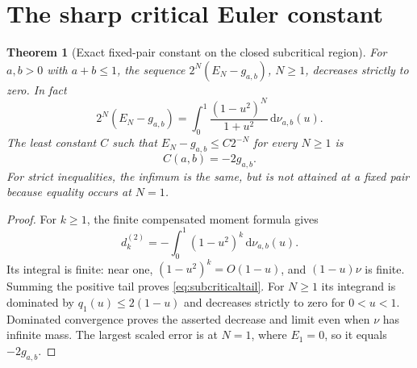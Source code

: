 \documentclass[11pt]{article}
\numberwithin{equation}{section}
\newtheorem{theorem}{Theorem}[section]
\theoremstyle{definition}
\theoremstyle{remark}
\newcommand{\dd}{\,\mathrm d}
\begin{document}
\section{The sharp critical Euler constant}
\label{sec:sharpconstant}
\begin{theorem}[Exact fixed-pair constant on the closed subcritical region]
\label{thm:pairconstant}
For $a,b>0$ with $a+b\le1$, the sequence
$2^N(E_N-g_{a,b})$, $N\ge1$, decreases strictly to zero. In fact
\begin{equation}\label{eq:subcriticaltail}
 2^N(E_N-g_{a,b})
 =\int_0^1\frac{(1-u^2)^N}{1+u^2}\dd\nu_{a,b}(u).
\end{equation}
The least constant $C$ such that
$E_N-g_{a,b}\le C2^{-N}$ for every $N\ge1$ is
\begin{equation}\label{eq:pairconstant}
 C(a,b)=-2g_{a,b}.
\end{equation}
For strict inequalities, the infimum is the same, but is not attained
at a fixed pair because equality occurs at $N=1$.
\end{theorem}
\begin{proof}
For $k\ge1$, the finite compensated moment formula gives
\[
 d_k^{(2)}=-\int_0^1(1-u^2)^k\dd\nu_{a,b}(u).
\]
Its integral is finite: near one, $(1-u^2)^k=O(1-u)$, and
$(1-u)\nu$ is finite. Summing the positive tail proves
\eqref{eq:subcriticaltail}. For $N\ge1$ its integrand is dominated
by $q_1(u)\le2(1-u)$ and decreases strictly to zero for $0<u<1$.
Dominated convergence proves the asserted decrease and limit even
when $\nu$ has infinite mass. The largest scaled error is at $N=1$,
where $E_1=0$, so it equals $-2g_{a,b}$.
\end{proof}
\end{document}
